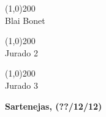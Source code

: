 \documentclass[oneside,12pt,letterpaper]{report}
\begin{document}
\begin{titlepage}
\begin{center}
\begin{minipage}{\textwidth}
\line(1,0){200} \\
Blai Bonet\\

\bigskip
\bigskip

\line(1,0){200} \\
Jurado 2\\

\bigskip
\bigskip

\line(1,0){200} \\
Jurado 3\\
\end{minipage}

\bigskip
\bigskip
\vfill

{\large \bfseries Sartenejas, (??/12/12)}

\end{center}
\end{titlepage}
\end{document}
